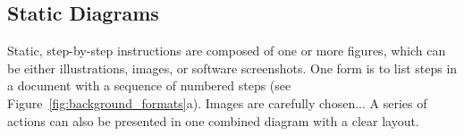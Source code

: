 

\subsection{Static Diagrams}

Static, step-by-step instructions are composed of one or more figures, which can be either illustrations, images, or software screenshots. One form is to list steps in a document with a sequence of numbered steps (see Figure~\ref{fig:background_formats}a). Images are carefully chosen...
%
A series of actions can also be presented in one combined diagram with a clear layout. 



